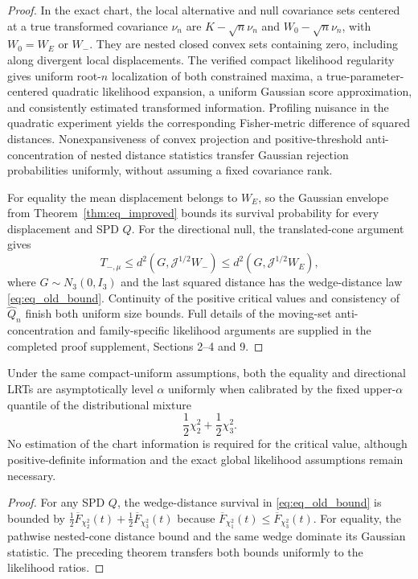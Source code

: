 \begin{proof}
In the exact chart, the local alternative and null covariance
sets centered at a true transformed covariance $\nu_n$ are
$K-\sqrt n\nu_n$ and $W_0-\sqrt n\nu_n$, with
$W_0=W_E$ or $W_-$. They are nested closed convex sets
containing zero, including along divergent local displacements.
The verified compact likelihood regularity gives uniform
root-$n$ localization of both constrained maxima, a
true-parameter-centered quadratic likelihood expansion, a
uniform Gaussian score approximation, and consistently estimated
transformed information. Profiling nuisance in the quadratic
experiment yields the corresponding Fisher-metric difference
of squared distances. Nonexpansiveness of convex projection
and positive-threshold anti-concentration of nested distance
statistics transfer Gaussian rejection probabilities uniformly,
without assuming a fixed covariance rank.

For equality the mean displacement belongs to $W_E$, so the
Gaussian envelope from Theorem~\ref{thm:eq_improved} bounds
its survival probability for every displacement and SPD $Q$.
For the directional null, the translated-cone argument gives
\[T_{-,\mu}\le d^2(G,\mathcal J^{1/2}W_-)
\le d^2(G,\mathcal J^{1/2}W_E),\]
where $G\sim N_3(0,I_3)$ and the last squared distance has
the wedge-distance law \eqref{eq:eq_old_bound}. Continuity of
the positive critical values and consistency of $\widehat Q_n$
finish both uniform size bounds. Full details of the moving-set
anti-concentration and family-specific likelihood arguments
are supplied in the completed proof supplement, Sections 2--4
and 9.
\end{proof}

\begin{corollary}
\label{cor:sec7-information-free}
Under the same compact-uniform assumptions, both the equality
and directional LRTs are asymptotically level $\alpha$ uniformly
when calibrated by the fixed upper-$\alpha$ quantile of the
distributional mixture
\begin{equation}\label{eq:sec7-universal-mixture}
 \boxed{\frac12\chi_2^2+\frac12\chi_3^2.}
\end{equation}
No estimation of the chart information is required for the
critical value, although positive-definite information and the
exact global likelihood assumptions remain necessary.
\end{corollary}
\begin{proof}
For any SPD $Q$, the wedge-distance survival in
\eqref{eq:eq_old_bound} is bounded by
$\tfrac12\overline F_{\chi_2^2}(t)+
\tfrac12\overline F_{\chi_3^2}(t)$ because
$\overline F_{\chi_1^2}(t)\le
\overline F_{\chi_3^2}(t)$. For equality, the pathwise
nested-cone distance bound and the same wedge dominate its
Gaussian statistic. The preceding theorem transfers both
bounds uniformly to the likelihood ratios.
\end{proof}

